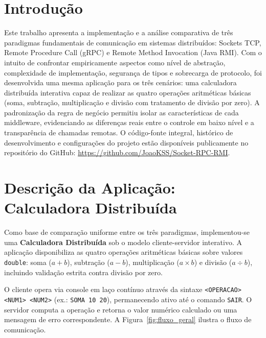 \documentclass[12pt, a4paper]{article}
\begin{document}
\section{Introdução}
Este trabalho apresenta a implementação e a análise comparativa de três paradigmas fundamentais de comunicação em sistemas distribuídos: Sockets TCP, Remote Procedure Call (gRPC) e Remote Method Invocation (Java RMI). Com o intuito de confrontar empiricamente aspectos como nível de abstração, complexidade de implementação, segurança de tipos e sobrecarga de protocolo, foi desenvolvida uma mesma aplicação para os três cenários: uma calculadora distribuída interativa capaz de realizar as quatro operações aritméticas básicas (soma, subtração, multiplicação e divisão com tratamento de divisão por zero). A padronização da regra de negócio permitiu isolar as características de cada middleware, evidenciando as diferenças reais entre o controle em baixo nível e a transparência de chamadas remotas. O código-fonte integral, histórico de desenvolvimento e configurações do projeto estão disponíveis publicamente no repositório do GitHub: \url{https://github.com/JoaoKSS/Socket-RPC-RMI}.

\section{Descrição da Aplicação: Calculadora Distribuída}

Como base de comparação uniforme entre os três paradigmas, implementou-se uma \textbf{Calculadora Distribuída} sob o modelo cliente-servidor interativo. A aplicação disponibiliza as quatro operações aritméticas básicas sobre valores \texttt{double}: soma ($a + b$), subtração ($a - b$), multiplicação ($a \times b$) e divisão ($a \div b$), incluindo validação estrita contra divisão por zero.

O cliente opera via console em laço contínuo através da sintaxe \texttt{<OPERACAO> <NUM1> <NUM2>} (ex.: \texttt{SOMA 10 20}), permanecendo ativo até o comando \texttt{SAIR}. O servidor computa a operação e retorna o valor numérico calculado ou uma mensagem de erro correspondente. A Figura~\ref{fig:fluxo_geral} ilustra o fluxo de comunicação.
\end{document}
